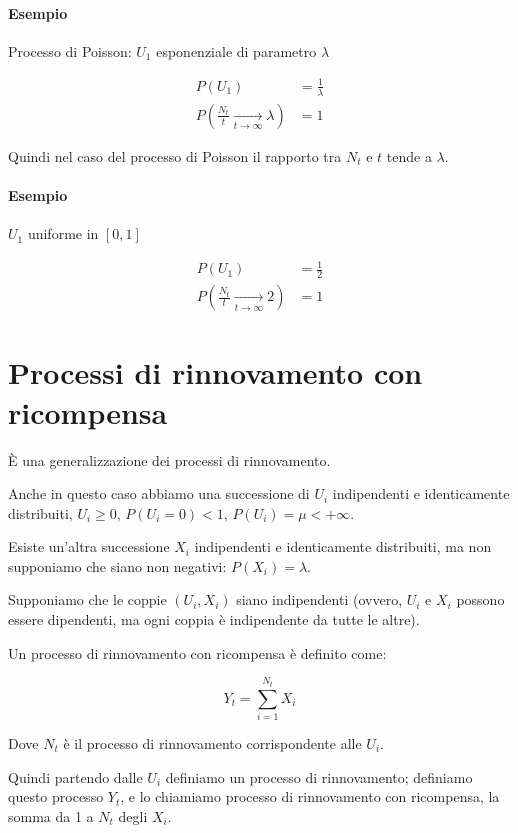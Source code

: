 \documentclass[a4paper,12pt]{book}
\begin{document}
\paragraph{Esempio} Processo di Poisson:
$ U_1 $ esponenziale di parametro $\lambda$

\begin{align*}
	P(U_1) & = \frac{1}{\lambda} \\
	P(\frac{N_t}{t} \underset{t \to \infty}{\longrightarrow} \lambda) & = 1
\end{align*}

Quindi nel caso del processo di Poisson il rapporto tra $ N_t $ e $ t $ tende a $\lambda$.

\paragraph{Esempio} 
$ U_1 $ uniforme in $ [0,1] $

\begin{align*}
	P(U_1) & = \frac{1}{2} \\
	P(\frac{N_t}{t} \underset{t \to \infty}{\longrightarrow} 2) & = 1
\end{align*}



\section{Processi di rinnovamento con ricompensa}
È una generalizzazione dei processi di rinnovamento. 

Anche in questo caso abbiamo una successione di $ U_i $ indipendenti  e identicamente distribuiti, $ U_i \ge 0 $, $ P(U_i = 0) < 1 $, $ P(U_i) = \mu < + \infty $.

Esiste un'altra successione $ X_i $ indipendenti e identicamente distribuiti, ma non supponiamo che siano non negativi: $ P(X_i) = \lambda $.

Supponiamo che le coppie $ (U_i, X_i) $ siano indipendenti (ovvero, $ U_i $ e $ X_i $ possono essere dipendenti, ma ogni coppia è indipendente da tutte le altre). 

Un processo di rinnovamento con ricompensa è definito come:

$$ Y_t = \sum_{i=1}^{N_t} X_i $$

Dove $ N_t $ è il processo di rinnovamento corrispondente alle $ U_i $.

Quindi partendo dalle $ U_i $ definiamo un processo di rinnovamento; definiamo questo processo $ Y_t $, e lo chiamiamo processo di rinnovamento con ricompensa, la somma da 1 a $ N_t $ degli $ X_i $.
\end{document}
